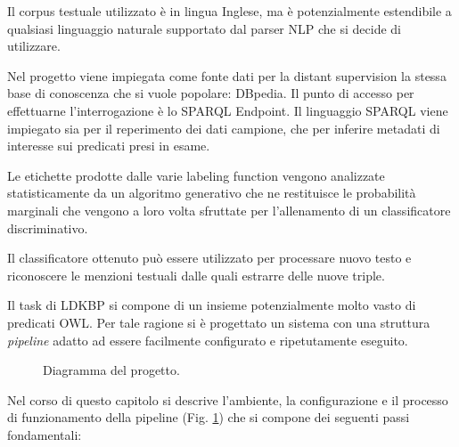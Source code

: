 Il corpus testuale utilizzato è in lingua Inglese, ma è potenzialmente estendibile a qualsiasi linguaggio naturale supportato dal parser NLP che si decide di utilizzare.

Nel progetto viene impiegata come fonte dati per la distant supervision la stessa base di conoscenza che si vuole popolare: DBpedia. Il punto di accesso per effettuarne l'interrogazione è lo SPARQL Endpoint. Il linguaggio SPARQL viene impiegato sia per il reperimento dei dati campione, che per inferire metadati di interesse sui predicati presi in esame. 

Le etichette prodotte dalle varie labeling function vengono analizzate statisticamente da un algoritmo generativo che ne restituisce le probabilità marginali che vengono a loro volta sfruttate per l'allenamento di un classificatore discriminativo.

Il classificatore ottenuto può essere utilizzato per processare nuovo testo e riconoscere le menzioni testuali dalle quali estrarre delle nuove triple.

Il task di LDKBP si compone di un insieme potenzialmente molto vasto di predicati OWL. Per tale ragione si è progettato un sistema con una struttura \textit{pipeline} adatto ad essere facilmente configurato e ripetutamente eseguito.

\begin{figure}[htb]
	\caption{Diagramma del progetto.}
	\label{fig:methods:project_diagram}
\end{figure}

Nel corso di questo capitolo si descrive l'ambiente, la configurazione e il processo di funzionamento della pipeline (Fig. \ref{fig:methods:project_diagram}) che si compone dei seguenti passi fondamentali:

